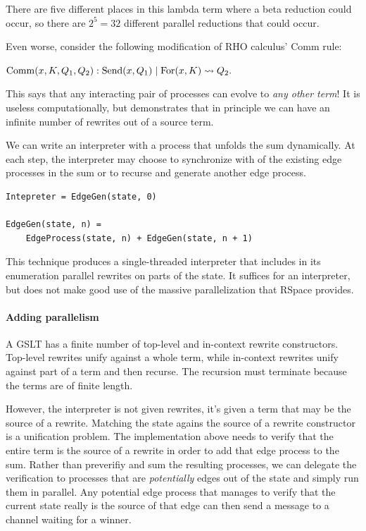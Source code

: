 \documentclass{article}
\begin{document}
There are five different places in this lambda term where a beta reduction could occur, so there are $2^5 = 32$ different parallel reductions that could occur.

Even worse, consider the following modification of RHO calculus' Comm rule: \bigskip

\noindent ${\rm Comm}(x, K, Q_1, Q_2): {\rm Send}(x, Q_1) \;|\; {\rm For}(x, K) \leadsto Q_2.$ \bigskip

\noindent This says that any interacting pair of processes can evolve to {\em any other term}!  It is useless computationally, but demonstrates that in principle we can have an infinite number of rewrites out of a source term.

We can write an interpreter with a process that unfolds the sum dynamically.  At each step, the interpreter may choose to synchronize with of the existing edge processes in the sum or to recurse and generate another edge process.

\begin{verbatim}
Intepreter = EdgeGen(state, 0)

EdgeGen(state, n) =
    EdgeProcess(state, n) + EdgeGen(state, n + 1)
\end{verbatim}

This technique produces a single-threaded interpreter that includes in its enumeration parallel rewrites on parts of the state.  It suffices for an interpreter, but does not make good use of the massive parallelization that RSpace provides.

\paragraph{Adding parallelism}

A GSLT has a finite number of top-level and in-context rewrite constructors.  Top-level rewrites unify against a whole term, while in-context rewrites unify against part of a term and then recurse.  The recursion must terminate because the terms are of finite length.

However, the interpreter is not given rewrites, it's given a term that may be the source of a rewrite.  Matching the state agains the source of a rewrite constructor is a unification problem.  The implementation above needs to verify that the entire term is the source of a rewrite in order to add that edge process to the sum.  Rather than preverifiy and sum the resulting processes, we can delegate the verification to processes that are {\em potentially} edges out of the state and simply run them in parallel.  Any potential edge process that manages to verify that the current state really is the source of that edge can then send a message to a channel waiting for a winner.
\end{document}
